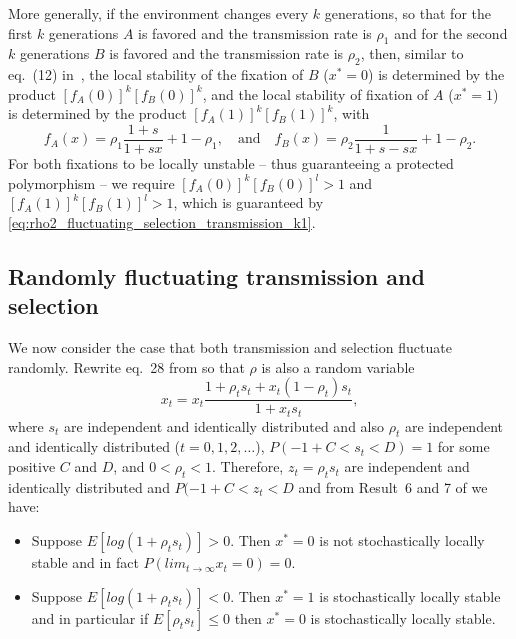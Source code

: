 \documentclass[12pt]{extarticle} %
\begin{document}
More generally, if the environment changes every $k$ generations, so that for the first $k$ generations $A$ is favored and the transmission rate is $\rho_1$ and for the second $k$ generations $B$ is favored and the transmission rate is $\rho_2$, then, similar to eq.~(12) in~\citet{Ram2018}, the local stability of the fixation of $B$ ($x^*=0$) is determined by the product $[f_A(0)]^k[f_B(0)]^k$, and the local stability of fixation of $A$ ($x^*=1$) is determined by the product  $[f_A(1)]^k[f_B(1)]^k$, with
\begin{equation}
f_A(x) = \rho_1 \frac{1+s}{1+sx} + 1 - \rho_1, \quad \text{and} \quad 
f_B(x) = \rho_2 \frac{1}{1+s-sx} + 1 - \rho_2.
\end{equation}
For both fixations to be locally unstable -- thus guaranteeing a protected polymorphism -- we require $[f_A(0)]^k[f_B(0)]^l>1$ and $[f_A(1)]^k[f_B(1)]^l>1$, which is guaranteed by \eqref{eq:rho2_fluctuating_selection_transmission_k1}.

\subsection*{Randomly fluctuating transmission and selection}

We now consider the case that both transmission and selection fluctuate randomly.
Rewrite eq.~28 from \citet{Ram2018} so that $\rho$ is also a random variable
\begin{equation}
x_t = x_t \frac{1 + \rho_t s_t + x_t (1 - \rho_t) s_t}{1 + x_t s_t},
\end{equation}
where $s_t$ are independent and identically distributed and also $\rho_t$ are independent and identically distributed ($t=0,1,2,\ldots$), $P(-1+C<s_t<D)=1$ for some positive $C$ and $D$, and $0<\rho_t<1$.
Therefore, $z_t = \rho_t s_t$  are independent and identically distributed and $P(-1+C < z_t < D$ and from Result~6 and 7 of \citet{Ram2018} we have:
\begin{itemize}
\item Suppose $E[log(1+\rho_t s_t)]>0$. Then $x^*=0$ is not stochastically locally stable and in fact $P(lim_{t \to \infty} x_t=0) = 0$.
\item Suppose $E[log(1+\rho_t s_t)]<0$. Then $x^*=1$ is stochastically locally stable and in particular if $E[\rho_t s_t] \le 0$ then $x^*=0$ is stochastically locally stable.
\end{itemize}
\end{document}
